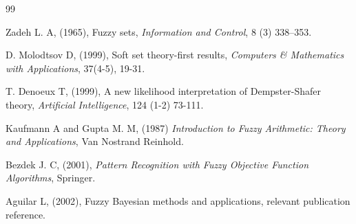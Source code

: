 \documentclass[twoside]{article}
\begin{document}
\begin{thebibliography}{99}

Zadeh L. A, (1965),
Fuzzy sets,
{\it Information and Control}, 8 (3) 338--353.

D. Molodtsov D, (1999),
Soft set theory-first results,
{\it Computers \& Mathematics with Applications}, 37(4-5), 19-31.

T. Denoeux T, (1999),
A new likelihood interpretation of Dempster-Shafer theory,
{\it Artificial Intelligence}, 124 (1-2) 73-111.



Kaufmann A and Gupta M. M, (1987)
{\it Introduction to Fuzzy Arithmetic: Theory and Applications},
Van Nostrand Reinhold.

 Bezdek J. C, (2001),
{\it Pattern Recognition with Fuzzy Objective Function Algorithms},
Springer.

Aguilar L, (2002),
Fuzzy Bayesian methods and applications,
relevant publication reference.

\end{thebibliography}
 
\end{document}
